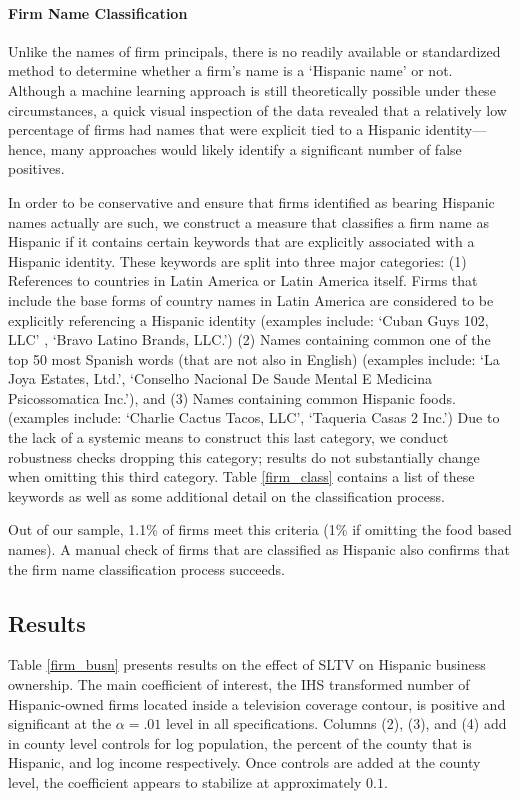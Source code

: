 \documentclass[11pt]{article}
\begin{document}
\paragraph{Firm Name Classification} Unlike the names of firm principals, there is no readily available or standardized method to determine whether a firm's name is a `Hispanic name' or not. Although a machine learning approach is still theoretically possible under these circumstances, a quick visual inspection of the data revealed that a relatively low percentage of firms had names that were explicit tied to a Hispanic identity---hence, many approaches would likely identify a significant number of false positives.

In order to be conservative and ensure that firms identified as bearing Hispanic names actually are such, we construct a measure that classifies a firm name as Hispanic if it contains certain keywords that are explicitly associated with a Hispanic identity. These keywords are split into three major categories: (1) References to countries in Latin America or Latin America itself. Firms that include the base forms of country names in Latin America are considered to be explicitly referencing a Hispanic identity (examples include: `Cuban Guys 102, LLC' , `Bravo Latino Brands, LLC.') (2) Names containing common one of the top 50 most Spanish words (that are not also in English) (examples include: `La Joya Estates, Ltd.', `Conselho Nacional De Saude Mental E Medicina Psicossomatica Inc.'), and (3) Names containing common Hispanic foods. (examples include: `Charlie Cactus Tacos, LLC', `Taqueria Casas 2 Inc.') Due to the lack of a systemic means to construct this last category, we conduct robustness checks dropping this category; results do not substantially change when omitting this third category. Table \ref{firm_class} contains a list of these keywords as well as some additional detail on the classification process.

Out of our sample, 1.1\% of firms meet this criteria (1\% if omitting the food based names). A manual check of firms that are classified as Hispanic also confirms that the firm name classification process succeeds.

\subsection{Results}

Table \ref{firm_busn} presents results on the effect of SLTV on Hispanic business ownership. The main coefficient of interest, the IHS transformed number of Hispanic-owned firms located inside a television coverage contour, is positive and significant at the $\alpha = .01$ level in all specifications. Columns (2), (3), and (4) add in county level controls for log population, the percent of the county that is Hispanic, and log income respectively. Once controls are added at the county level, the coefficient appears to stabilize at approximately $0.1$.
\end{document}
